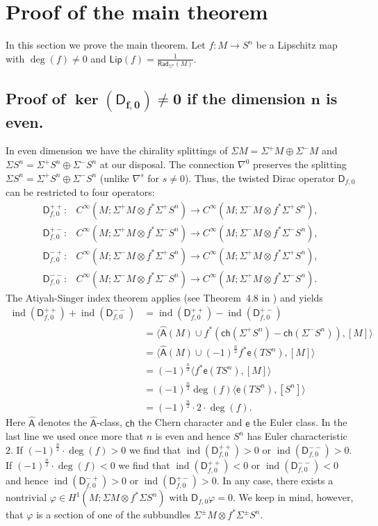 \documentclass[11pt,reqno]{amsart}
\newcommand{\RadSn}{\mathsf{Rad}_{\Sn}}
\newcommand{\Lip}{\mathsf{Lip}}
\newcommand{\ns}{\nabla^s}
\newcommand{\nn}{\nabla^0}
\newcommand{\Sn}{\mathbb{S}^n}
\newcommand{\D}{\mathsf{D}}
\renewcommand{\phi}{\varphi}
\newcommand{\Ahat}{\mathsf{\hat A}}
\newcommand{\ch}{\mathsf{ch}}
\newcommand{\e}{\mathsf{e}}
\newcommand{\<}{\langle}
\renewcommand{\>}{\rangle}
\DeclareMathOperator{\ind}{\mathrm{ind}}
\theoremstyle{definition}
\begin{document}
\section{Proof of the main theorem} 
\label{sec.spherrad} 

In this section we prove the main theorem.
Let $f\colon M\to S^n$ be a Lipschitz map with $\deg(f)\ne0$ and $\Lip(f)=\frac{1}{\RadSn(M)}$.

\subsection{\texorpdfstring{Proof of $\boldsymbol{\ker(\D_{f,0})\ne0}$ if the dimension $\boldsymbol{n}$ is even.}{Proof of ker(Df,0)≠0 if the dimension n is even}}
\label{subsec.nontrivialkernel}
In even dimension we have the chirality splittings of $\Sigma M=\Sigma^+M\oplus \Sigma^-M$ and $\Sigma S^n=\Sigma^+S^n\oplus \Sigma^-S^n$ at our disposal.
The connection $\nn$ preserves the splitting $\Sigma S^n=\Sigma^+S^n\oplus \Sigma^-S^n$ (unlike $\ns$ for $s\ne0$).
Thus, the twisted Dirac operator $\D_{f,0}$ can be restricted to four operators:
\begin{align*}
\D_{f,0}^{++}\colon& C^\infty(M;\Sigma^+ M\otimes f^*\Sigma^+ S^n)\to C^\infty(M;\Sigma^- M\otimes f^*\Sigma^+ S^n),\\
\D_{f,0}^{+-}\colon& C^\infty(M;\Sigma^+ M\otimes f^*\Sigma^- S^n)\to C^\infty(M;\Sigma^- M\otimes f^*\Sigma^- S^n),\\
\D_{f,0}^{-+}\colon& C^\infty(M;\Sigma^- M\otimes f^*\Sigma^+ S^n)\to C^\infty(M;\Sigma^+ M\otimes f^*\Sigma^+ S^n),\\
\D_{f,0}^{--}\colon& C^\infty(M;\Sigma^- M\otimes f^*\Sigma^- S^n)\to C^\infty(M;\Sigma^+ M\otimes f^*\Sigma^- S^n).
\end{align*}
The Atiyah-Singer index theorem applies (see Theorem~4.8 in \cite{CHS}) and yields
\begin{align*}
\ind(\D_{f,0}^{++}) + \ind(\D_{f,0}^{--})
&=
\ind(\D_{f,0}^{++}) - \ind(\D_{f,0}^{+-}) \\
&=
\<\Ahat(M)\cup f^*(\ch(\Sigma^+ S^n) - \ch(\Sigma^- S^n)),[M]\>\\
&=
\< \Ahat(M)\cup (-1)^{\frac{n}{2}}f^*\e(TS^n),[M]\>\\
&=
(-1)^{\frac{n}{2}}\< f^*\e(TS^n) ,[M]\>\\
&=
(-1)^{\frac{n}{2}}\deg(f)\<\e(TS^n),[S^n]\> \\
&= 
(-1)^{\frac{n}{2}}\cdot 2\cdot\deg(f).
\end{align*}
Here $\Ahat$ denotes the $\Ahat$-class, $\ch$ the Chern character and $\e$ the Euler class.
In the last line we used once more that $n$ is even and hence $S^n$ has Euler characteristic~$2$.
If $(-1)^{\frac{n}{2}}\cdot\deg(f)>0$ we find that $\ind(\D_{f,0}^{++})>0$ or $\ind(\D_{f,0}^{--})>0$.
If $(-1)^{\frac{n}{2}}\cdot\deg(f)<0$ we find that $\ind(\D_{f,0}^{++})<0$ or $\ind(\D_{f,0}^{--})<0$ and hence $\ind(\D_{f,0}^{-+})>0$ or $\ind(\D_{f,0}^{+-})>0$.
In any case, there exists a nontrivial $\phi\in H^1(M;\Sigma M\otimes f^*\Sigma S^n)$ with $\D_{f,0}\phi=0$.
We keep in mind, however, that $\phi$ is a section of one of the subbundles $\Sigma^\pm M\otimes f^*\Sigma^\pm S^n$.
\end{document}
